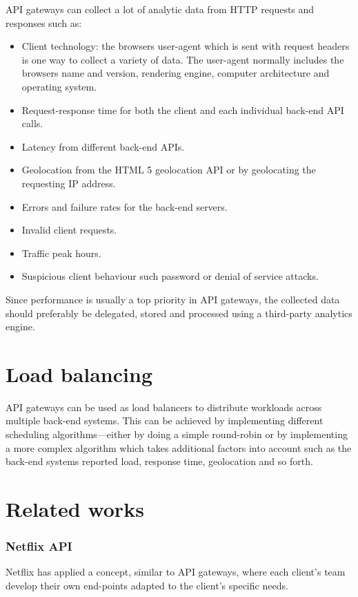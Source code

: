 \documentclass{cslthse-msc}
\begin{document}
\vspace{5mm}

\noindent API gateways can collect a lot of analytic data from HTTP requests and responses such as:
\begin{itemize}
	\item Client technology: the browsers user-agent which is sent with request headers is one way to collect a variety of data. The user-agent normally includes the browsers name and version, rendering engine, computer architecture and operating system.
	\item Request-response time for both the client and each individual back-end API calls.
	\item Latency from different back-end APIs.
	\item Geolocation from the HTML 5 geolocation API\cite{html5_geolocation} or by geolocating the requesting IP address.
	\item Errors and failure rates for the back-end servers.
	\item Invalid client requests.
	\item Traffic peak hours.
	\item Suspicious client behaviour such password or denial of service attacks.
\end{itemize}

\noindent Since performance is usually a top priority in API gateways, the collected data should preferably be delegated, stored and processed using a third-party analytics engine.

\section{Load balancing}
API gateways can be used as load balancers to distribute workloads across multiple back-end systems. This can be achieved by implementing different scheduling algorithms---either by doing a simple round-robin or by implementing a more complex algorithm which takes additional factors into account such as the back-end systems reported load, response time, geolocation and so forth.

\section{Related works}

\subsubsection{Netflix API}
Netflix has applied a concept, similar to API gateways, where each client's team develop their own end-points adapted to the client's specific needs.
\end{document}
